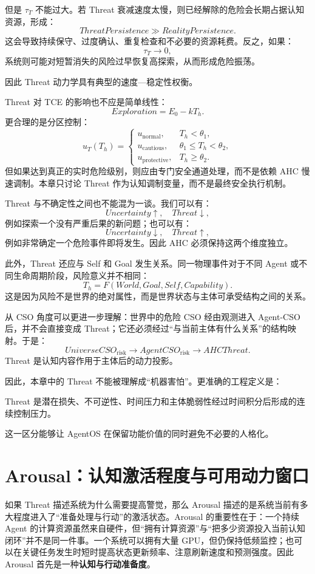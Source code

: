 但是 \(\tau_T\) 不能过大。若 Threat 衰减速度太慢，则已经解除的危险会长期占据认知资源，形成：
\[
ThreatPersistence
\gg
RealityPersistence.
\]
这会导致持续保守、过度确认、重复检查和不必要的资源耗费。反之，如果：
\[
\tau_T\rightarrow0,
\]
系统则可能对短暂消失的风险过早恢复高探索，从而形成危险振荡。

因此 Threat 动力学具有典型的速度—稳定性权衡。

Threat 对 TCE 的影响也不应是简单线性：
\[
Exploration
=
E_0-kT_h.
\]
更合理的是分区控制：
\[
u_T(T_h)=
\begin{cases}
u_{\mathrm{normal}},
&T_h<\theta_1,\\
u_{\mathrm{cautious}},
&\theta_1\leq T_h<\theta_2,\\
u_{\mathrm{protective}},
&T_h\geq\theta_2.
\end{cases}
\]
但如果达到真正的实时危险级别，则应由专门安全通道处理，而不是依赖 AHC 慢速调制。本章只讨论 Threat 作为认知调制变量，而不是最终安全执行机制。

Threat 与不确定性之间也不能混为一谈。我们可以有：
\[
Uncertainty\uparrow,\quad Threat\downarrow,
\]
例如探索一个没有严重后果的新问题；也可以有：
\[
Uncertainty\downarrow,\quad Threat\uparrow,
\]
例如非常确定一个危险事件即将发生。因此 AHC 必须保持这两个维度独立。

此外，Threat 还应与 Self 和 Goal 发生关系。同一物理事件对于不同 Agent 或不同生命周期阶段，风险意义并不相同：
\[
T_h
=
F(
World,
Goal,
Self,
Capability
).
\]
这是因为风险不是世界的绝对属性，而是世界状态与主体可承受结构之间的关系。

从 CSO 角度可以更进一步理解：世界中的危险 CSO 经由观测进入 Agent-CSO 后，并不会直接变成 Threat；它还必须经过“与当前主体有什么关系”的结构映射。于是：
\[
UniverseCSO_{\mathrm{risk}}
\rightarrow
AgentCSO_{\mathrm{risk}}
\rightarrow
AHCThreat.
\]
Threat 是认知内容作用于主体后的动力投影。

因此，本章中的 Threat 不能被理解成“机器害怕”。更准确的工程定义是：
\begin{definition*}
Threat 是潜在损失、不可逆性、时间压力和主体脆弱性经过时间积分后形成的连续控制压力。
\end{definition*}
这一区分能够让 AgentOS 在保留功能价值的同时避免不必要的人格化。

\section{Arousal：认知激活程度与可用动力窗口}

如果 Threat 描述系统为什么需要提高警觉，那么 Arousal 描述的是系统当前有多大程度进入了“准备处理与行动”的激活状态。Arousal 的重要性在于：一个持续 Agent 的计算资源虽然来自硬件，但“拥有计算资源”与“把多少资源投入当前认知闭环”并不是同一件事。一个系统可以拥有大量 GPU，但仍保持低频监控；也可以在关键任务发生时短时提高状态更新频率、注意刷新速度和预测强度。因此 Arousal 首先是一种\textbf{认知与行动准备度}。

